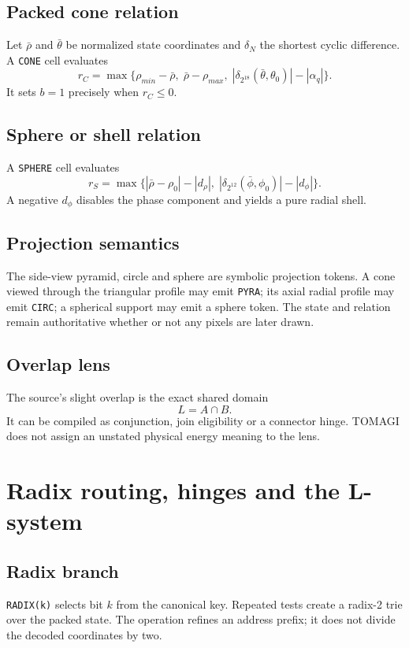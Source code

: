 \documentclass[11pt,a4paper]{article}
\newcommand{\code}[1]{\texttt{#1}}
\begin{document}
\subsection{Packed cone relation}
Let $\bar\rho$ and $\bar\theta$ be normalized state coordinates and $\delta_N$ the shortest cyclic difference. A \code{CONE} cell evaluates
\begin{equation}
r_C=\max\{\rho_{min}-\bar\rho,\;\bar\rho-\rho_{max},\;|\delta_{2^{18}}(\bar\theta,\theta_0)|-|\alpha_q|\}.
\end{equation}
It sets $b=1$ precisely when $r_C\le0$.

\subsection{Sphere or shell relation}
A \code{SPHERE} cell evaluates
\begin{equation}
r_S=\max\{|\bar\rho-\rho_0|-|d_\rho|,\;|\delta_{2^{12}}(\bar\phi,\phi_0)|-|d_\phi|\}.
\end{equation}
A negative $d_\phi$ disables the phase component and yields a pure radial shell.

\subsection{Projection semantics}
The side-view pyramid, circle and sphere are symbolic projection tokens. A cone viewed through the triangular profile may emit \code{PYRA}; its axial radial profile may emit \code{CIRC}; a spherical support may emit a sphere token. The state and relation remain authoritative whether or not any pixels are later drawn.

\subsection{Overlap lens}
The source's slight overlap is the exact shared domain
\begin{equation}
L=A\cap B.
\end{equation}
It can be compiled as conjunction, join eligibility or a connector hinge. TOMAGI does not assign an unstated physical energy meaning to the lens.

\section{Radix routing, hinges and the L-system}

\subsection{Radix branch}
\code{RADIX(k)} selects bit $k$ from the canonical key. Repeated tests create a radix-2 trie over the packed state. The operation refines an address prefix; it does not divide the decoded coordinates by two.
\end{document}
